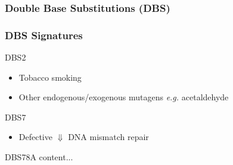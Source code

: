 \documentclass{beamer}
\begin{document}
    \subsubsection{Double Base Substitutions (DBS)}
    \begin{frame}[allowframebreaks]
        \frametitle{DBS Signatures}

        \begin{block}{DBS2}
            \begin{itemize}
                \item Tobacco smoking \cite{signature6}
                \item Other endogenous/exogenous mutagens \textit{e.g.} acetaldehyde
            \end{itemize}
        \end{block}

        \begin{block}{DBS7}
            \begin{itemize}
                \item Defective $\Downarrow$ DNA mismatch repair \cite{signature1}
            \end{itemize}
        \end{block}

        \begin{block}{DBS78A}
            content...
        \end{block}
    \end{frame}
\end{document}
